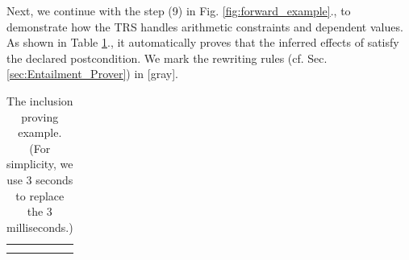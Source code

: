 \documentclass[acmsmall,10pt,review]{acmart}
\newcommand{\effect}{\textcolor{black}{\ensuremath{\mathrm{\Phi}}}}
\newcommand{\anyevent}[1]{{\textcolor{darkred}
{{\textbf{\footnotesize #1}}}}}
\newcommand{\code}[1]{{\tt{\ensuremath{\m{#1}}}}}
\newcommand{\m}{\mathit}
\newcommand\figref[1]{Fig. \textcolor{black}{\ref{#1}}.}
\newcommand\tabref[1]{Table \textcolor{black}{\ref{#1}}.}
\newcommand\secref[1]{Sec. \textcolor{black}{\ref{#1}}}
\begin{document}
{%



Next, we continue with the step (9) in \figref{fig:forward_example}, to 
demonstrate how the TRS handles arithmetic constraints and dependent values. 
As shown in \tabref{tab:rewriting_tree_send}, it automatically proves that the inferred effects of {}
 satisfy the declared postcondition. 
We mark the rewriting rules (cf. \secref{sec:Entailment_Prover}) in \textcolor{mGray}{[gray]}.

{
\begin{table}[ht]
\centering
      \vspace{0mm}
\caption{\label{tab:rewriting_tree_send} The inclusion proving example. (For simplicity, we use 3 seconds to replace the 3 milliseconds.)}
      
\vspace{-1mm}
\begin{adjustbox}{width=1\textwidth}
 \Large\begin{tabular}[t]{l}
  \hline\\
{

}
\end{tabular}
\end{adjustbox}
\end{table}}}
\end{document}
